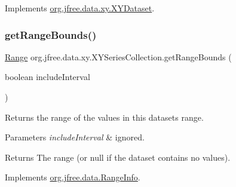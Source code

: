 Implements \mbox{\hyperlink{interfaceorg_1_1jfree_1_1data_1_1xy_1_1_x_y_dataset_ae81f9de91dfcae45028fc8a486a119da}{org.\+jfree.\+data.\+xy.\+X\+Y\+Dataset}}.

\mbox{\label{classorg_1_1jfree_1_1data_1_1xy_1_1_x_y_series_collection_af2e690925c633815d6e33f1b83b5040e}} 
\subsubsection{\texorpdfstring{get\+Range\+Bounds()}{getRangeBounds()}}
{\footnotesize\ttfamily \mbox{\hyperlink{classorg_1_1jfree_1_1data_1_1_range}{Range}} org.\+jfree.\+data.\+xy.\+X\+Y\+Series\+Collection.\+get\+Range\+Bounds (\begin{DoxyParamCaption}\item[{boolean}]{include\+Interval }\end{DoxyParamCaption})}

Returns the range of the values in this dataset\textquotesingle{}s range.


\begin{DoxyParams}{Parameters}
{\em include\+Interval} & ignored.\\
\hline
\end{DoxyParams}
\begin{DoxyReturn}{Returns}
The range (or {\ttfamily null} if the dataset contains no values). 
\end{DoxyReturn}


Implements \mbox{\hyperlink{interfaceorg_1_1jfree_1_1data_1_1_range_info_a2752094d868839b5565131a5bdd8e75e}{org.\+jfree.\+data.\+Range\+Info}}.

\mbox{\label{classorg_1_1jfree_1_1data_1_1xy_1_1_x_y_series_collection_a7ea06c4bfb1643bfabceb59a89d3360f}} 
